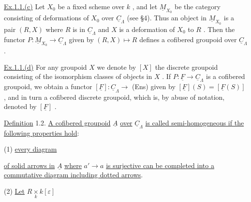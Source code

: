 \underline{Ex.1.1.(c)}  Let  $X_0$  be a fixed scheme over  $k$  , and let  $\underline{M}_{X_0}$  be the category consisting of deformations of  $X_0$  over  $\underline{C}_{\Lambda}$  (see §4). Thus an object in $\underline{M}_{X_0}$  is a pair  $(R,X)$  where  $R$  is in  $\underline{C}_{\Lambda}$  and  $X$  is a deformation of  $X_0$  to $R$  . Then the functor  $P : \underline{M}_{X_0} \to \underline{C}_{\Lambda}$  given by  $(R,X) \longmapsto R$  defines a cofibered groupoid over  $\underline{C}_{\Lambda}$  .

\underline{Ex.1.1.(d)}  For any groupoid  $X$  we denote by  $[X]$  the discrete groupoid consisting of the isomorphism classes of objects in  $X$  . If  $P : \underline{F} \to \underline{C}_{\Lambda}$  is a cofibered groupoid, we obtain a functor  $[\underline{F}] : \underline{C}_{\Lambda} \to$ (Ens)  given by $[\underline{F}](S) = [\underline{F}(S)]$  , and in turn a cofibered discrete groupoid, which is, by abuse of notation, denoted by  $[\underline{F}]$  .

\underline{Definition} 1.2.  \underline{A cofibered groupoid}  $\underline{A}$  \underline{over}  $\underline{C}_{\Lambda}$  \underline{is called semi-homogeneous if the following properties hold}:

(1) \underline{every diagram}

\begin{center}
\end{center}
\underline{of solid arrows in}  $\underline{A}$  \underline{where}  $a' \to a$  \underline{is surjective can be completed into a commutative diagram including dotted arrows}.

(2) \underline{Let}  $R \underset{k}{\times} k[\varepsilon]$

